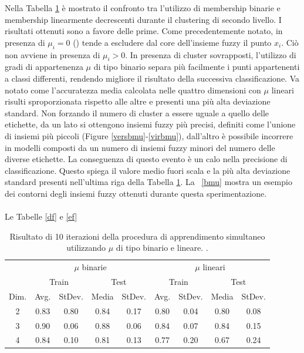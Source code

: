 \documentclass [11pt,a4paper,twoside,openright] {book}
\begin{document}
\noindent
Nella Tabella \ref{blmu} è mostrato il confronto tra l'utilizzo di membership binarie e membership linearmente decrescenti durante il clustering di secondo livello. I risultati ottenuti sono a favore delle prime. Come precedentemente notato, in presenza di $\mu_i = 0$ () tende a escludere dal core dell'insieme fuzzy il punto $x_i$. Ciò non avviene in presenza di $\mu_i > 0$. In presenza di cluster sovrapposti, l'utilizzo di gradi di appartenenza $\mu$ di tipo binario separa più facilmente i punti appartenenti a classi differenti, rendendo migliore il risultato della successiva classificazione. Va notato come l'accuratezza media calcolata nelle quattro dimensioni con $\mu$ lineari risulti sproporzionata rispetto alle altre e presenti una più alta deviazione standard. Non forzando il numero di cluster a essere uguale a quello delle etichette, da un lato si ottengono insiemi fuzzy più precisi, definiti come l'unione di insiemi più piccoli (Figure \ref{versbmu}-\ref{virbmu}), dall'altro è possibile incorrere in modelli composti da un numero di  insiemi fuzzy minori del numero delle diverse etichette. La conseguenza di questo evento è un calo nella precisione di classificazione. Questo spiega il valore medio fuori scala e la più alta deviazione standard presenti nell'ultima riga della Tabella \ref{blmu}. La \figurename~\ref{bmu} mostra un esempio dei contorni degli insiemi fuzzy ottenuti durante questa sperimentazione.\\\\Le Tabelle \ref{df} e \ref{ef}
\begin{table}[!tb]
\caption{Risultato di 10 iterazioni della procedura di apprendimento simultaneo utilizzando $\mu$ di tipo binario e lineare. \label{blmu}.}
\begin{tabular}{|c|c|c|c|c|c|c|c|c|}
\hline
& \multicolumn{4}{|c|}{$\mu$ binarie} & \multicolumn{4}{|c|}{$\mu$ lineari}\\
\cline{2-9}
& \multicolumn{2}{|c|}{Train} & \multicolumn{2}{|c|}{Test} & \multicolumn{2}{|c|}{Train} & \multicolumn{2}{|c|}{Test}\\
\hline
Dim. & Avg. & StDev. & Media & StDev. & Avg. & StDev. & Media & StDev. \\
\hline
2 & 0.83 & 0.80 & 0.84 & 0.17 & 0.80 & 0.04 & 0.80 & 0.08 \\
3 & 0.90 & 0.06 & 0.88 & 0.06 & 0.84 & 0.07 & 0.84 & 0.15 \\
4 & 0.84 & 0.10 & 0.81 & 0.13 & 0.77 & 0.20 & 0.67 & 0.24 \\
\hline
\end{tabular}
\end{table}
\end{document}
